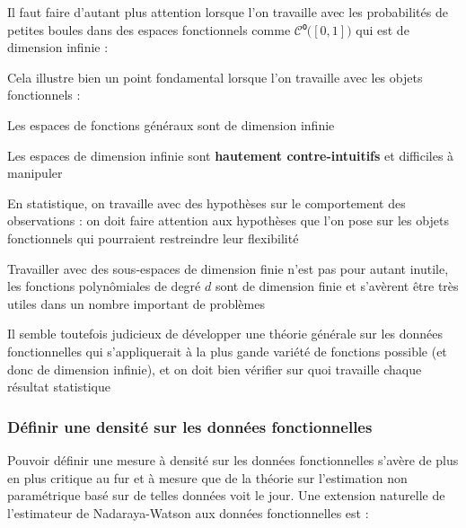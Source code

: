 {{        Il faut faire d'autant plus attention lorsque l'on travaille avec les probabilités de petites boules dans des espaces fonctionnels comme $\mathcal C⁰ \bigl( [0,1] \bigr)$ qui est de dimension infinie :


        \noindent Cela illustre bien un point fondamental lorsque l'on travaille avec les objets fonctionnels :

        \begin{todolist}
            \item Les espaces de fonctions généraux sont de dimension infinie
            \item[\crossed] Les espaces de dimension infinie sont \textbf{hautement contre-intuitifs} et difficiles à manipuler
            \item En statistique, on travaille avec des hypothèses sur le comportement des observations : on doit faire attention aux hypothèses que l'on pose sur les objets fonctionnels qui pourraient restreindre leur flexibilité
            \item[\checked] Travailler avec des sous-espaces de dimension finie n'est pas pour autant inutile, les fonctions polynômiales de degré $d$ sont de dimension finie et s'avèrent être très utiles dans un nombre important de problèmes
            \item[\crossed] Il semble toutefois judicieux de développer une théorie générale sur les données fonctionnelles qui s'appliquerait à la plus gande variété de fonctions possible (et donc de dimension infinie), et on doit bien vérifier sur quoi travaille chaque résultat statistique 
            
        \end{todolist}


        \subsubsection{Définir une densité sur les données fonctionnelles}
        
        Pouvoir définir une mesure à densité sur les données fonctionnelles s'avère de plus en plus critique au fur et à mesure que de la théorie sur l'estimation non paramétrique basé sur de telles données voit le jour.
        Une extension naturelle de l'estimateur de Nadaraya-Watson aux données fonctionnelles est :

}}
